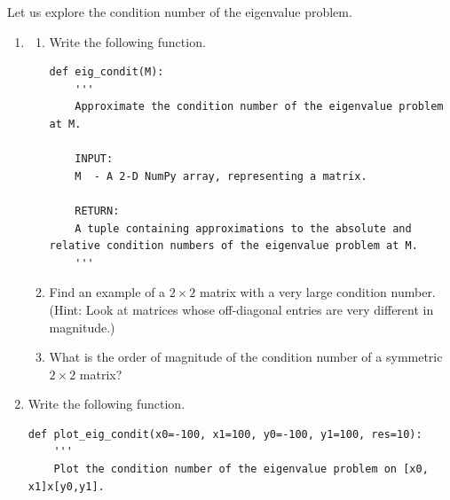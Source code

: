 \begin{problem}[Optional]\label{prob:eigenvalue}
Let us explore the condition number of the eigenvalue problem.
\begin{enumerate}
\item \begin{enumerate}
\item Write the following function.
\begin{lstlisting}
def eig_condit(M):
    '''
    Approximate the condition number of the eigenvalue problem at M.
    
    INPUT:
    M  - A 2-D NumPy array, representing a matrix.
    
    RETURN:
    A tuple containing approximations to the absolute and relative condition numbers of the eigenvalue problem at M.
    '''
\end{lstlisting}
\item Find an example of a $2\times2$ matrix with a very large condition number. 
(Hint: Look at matrices whose off-diagonal entries are very different in magnitude.)
\item What is the order of magnitude of the condition number of a symmetric $2\times 2$ matrix?
\end{enumerate}
\item Write the following function.
\begin{lstlisting}
def plot_eig_condit(x0=-100, x1=100, y0=-100, y1=100, res=10):
    '''
    Plot the condition number of the eigenvalue problem on [x0, x1]x[y0,y1].
    

\end{lstlisting}
\end{enumerate}
\end{problem}
